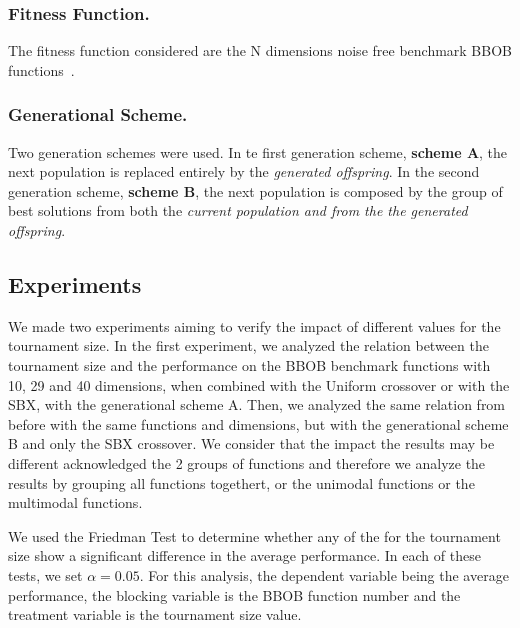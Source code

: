 \subsubsection*{Fitness Function.}
The fitness function considered are the N dimensions noise free benchmark BBOB functions~\cite{hansen2010real}.





\subsubsection*{Generational Scheme.}
Two generation schemes were used. In te first generation scheme, \textbf{scheme A}, the next population is replaced entirely by the \textit{generated offspring}. In the second generation scheme, \textbf{scheme B}, the next population is composed by the group of best solutions from both the \textit{current population and from the the generated offspring}.

\label{sec:experiment}

\subsection{Experiments}
We made two experiments aiming to verify the impact of different values for the tournament size. In the first experiment, we analyzed the relation between the tournament size and the performance on the BBOB benchmark functions with 10, 29 and 40 dimensions, when combined with the Uniform crossover or with the SBX, with the generational scheme A. Then, we analyzed the same relation from before with the same functions and dimensions, but with the generational scheme B and only the SBX crossover. We consider that the impact the results may be different acknowledged the 2 groups of functions and therefore we analyze the results by grouping all functions togethert, or the unimodal functions or the multimodal functions. 

We used the Friedman Test to determine whether any of the for the tournament size show a significant difference in the average performance. In each of these tests, we set $\alpha = 0.05$. For this analysis, the dependent variable being the average performance, the blocking variable is the BBOB function number and the treatment variable is the tournament size value.



